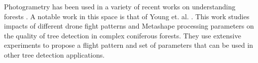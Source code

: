 Photogrametry has been used in a variety of recent works on understanding forests \cite{Swayze2021InfluenceDensity, doi:10.1139/cjfr-2020-0433}. A notable work in this space is that of Young et. al. \cite{Young2022}. This work studies impacts of different drone fight patterns and Metashape processing parameters on the quality of tree detection in complex coniferous forests. They use extensive experiments to propose a flight pattern and set of parameters that can be used in other tree detection applications.


%
%

